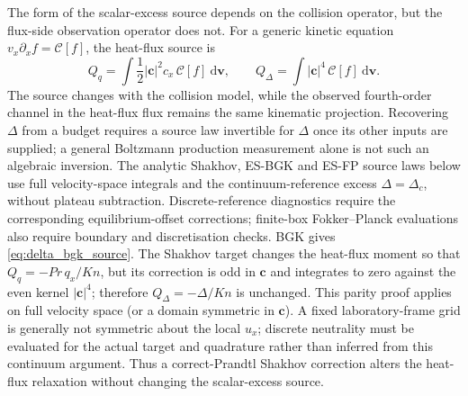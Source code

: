 \documentclass[lineno,paper]{JFM-FLM_Au}
\newenvironment{revision}{\nolinenumbers\begin{tcolorbox}[breakable,colback=revisionyellow,colframe=revisionyellow,boxrule=0pt,arc=0pt,left=5pt,right=5pt,top=5pt,bottom=5pt,before skip=6pt,after skip=6pt]\captionsetup{width=\linewidth}}{\end{tcolorbox}\linenumbers}
\newenvironment{revision}{}{}
\newcommand{\Kn}{\mathit{Kn}}
\newcommand{\dd}{\mathrm{d}}
\begin{document}
\begin{revision}
The form of the scalar-excess source depends on the collision operator, but the flux-side observation operator does not.  For a generic kinetic equation $v_x\partial_x f=\mathcal C[f]$, the heat-flux source is
\begin{equation}
  Q_q=\int \frac12 |\boldsymbol c|^2 c_x\,\mathcal C[f]~\dd\boldsymbol v,
  \qquad
  Q_\Delta=\int |\boldsymbol c|^4\,\mathcal C[f]~\dd\boldsymbol v .
  \label{eq:generic_sources}
\end{equation}
The source changes with the collision model, while the observed fourth-order channel in the heat-flux flux remains the same kinematic projection. Recovering $\Delta$ from a budget requires a source law invertible for $\Delta$ once its other inputs are supplied; a general Boltzmann production measurement alone is not such an algebraic inversion. The analytic Shakhov, ES-BGK and ES-FP source laws below use full velocity-space integrals and the continuum-reference excess $\Delta=\Delta_c$, without plateau subtraction. Discrete-reference diagnostics require the corresponding equilibrium-offset corrections; finite-box Fokker--Planck evaluations also require boundary and discretisation checks.  BGK gives \eqref{eq:delta_bgk_source}.  The Shakhov target changes the heat-flux moment so that $Q_q=-Pr\,q_x/\Kn$, but its correction is odd in $\boldsymbol c$ and integrates to zero against the even kernel $|\boldsymbol c|^4$; therefore $Q_\Delta=-\Delta/\Kn$ is unchanged. This parity proof applies on full velocity space (or a domain symmetric in $\boldsymbol c$). A fixed laboratory-frame grid is generally not symmetric about the local $u_x$; discrete neutrality must be evaluated for the actual target and quadrature rather than inferred from this continuum argument. Thus a correct-Prandtl Shakhov correction alters the heat-flux relaxation without changing the scalar-excess source.
\end{revision}
\end{document}
